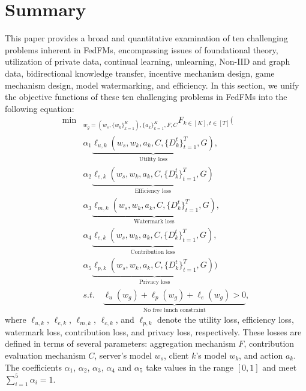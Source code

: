 \section{Summary}
\label{sec:summay}
This paper provides a broad and quantitative examination of ten challenging problems inherent in FedFMs, encompassing issues of foundational theory, utilization of private data, continual learning, unlearning, Non-IID and graph data, bidirectional knowledge transfer, incentive mechanism design, game mechanism design, model watermarking, and efficiency. 
In this section, we unify the objective functions of these ten challenging problems in FedFMs into the following equation: 
\begin{equation}\label{eq:unifed}
    \begin{split}
        \min&_{w_g=(w_s, \{w_k\}_{k=1}^K), \{a_k\}_{k=1}^K,F,C}F_{k\in[K], t\in [T] }\Big( \\
        &\alpha_1\underbrace{\ell_{u,k}(w_s,w_k,a_k,C,\{D_k^t\}_{t=1}^T, G)}_{\text{Utility loss}}, \\
        &\alpha_2\underbrace{\ell_{e,k}(w_s,w_k,a_k,C,\{D_k^t\}_{t=1}^T,G)}_{\text{Efficiency loss}}\\
               &\alpha_3\underbrace{\ell_{m,k}(w_s,w_k,a_k,C,\{D_k^t\}_{t=1}^T, G)}_{\text{Watermark loss}}, \\
              &\alpha_4\underbrace{\ell_{c,k}(w_s,w_k,a_k,C,\{D_k^t\}_{t=1}^T, G) }_{\text{Contribution loss}}, \\
              & \alpha_5\underbrace{\ell_{p,k}(w_s,w_k,a_k,C,\{D_k^t\}_{t=1}^T, G) \Big)}_{\text{Privacy loss}} \\
            & s.t.\quad  \underbrace{\ell_u(w_g) + \ell_p(w_g)+\ell_e(w_g)>0}_{\text{No free lunch constraint}},
    \end{split}
\end{equation}
where $\ell_{u,k}$, $\ell_{e,k}$, $\ell_{m,k}$, $\ell_{c,k}$, and $\ell_{p,k}$ denote the utility loss, efficiency loss, watermark loss, contribution loss, and privacy loss, respectively. These losses are defined in terms of several parameters: aggregation mechanism $F$, contribution evaluation mechanism $C$, server's model $w_s$, client $k$'s model $w_k$, and action $a_k$. The coefficients $\alpha_1$, $\alpha_2$, $\alpha_3$, $\alpha_4$ and $\alpha_5$ take values in the range $[0, 1]$ and meet $\sum_{i=1}^5\alpha_i=1$. 
